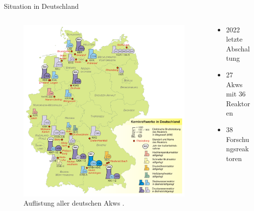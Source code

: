\begin{frame}{ Situation in Deutschland }
  \begin{columns}

    \begin{column}{0.48\textwidth}
      \begin{figure}
        \centering
        \includegraphics[width=1\textwidth]{./bilder/Kernkraftwerke_in_Deutschland.png}
        \caption{ Auflistung aller deutschen Akws \cite{ karte_abschaltungen }. }
        \label{ fig: karte_abschaltungen }
      \end{figure}
    \end{column}

    \begin{column}{0.48\textwidth}
      \begin{itemize}
        \setlength\itemsep{1.2em}
          \item{ 2022 letzte Abschaltung }
          \item{ 27 Akws mit 36 Reaktoren }
          \item{ 38 Forschungsreaktoren}
        \end{itemize}
    \end{column}
  \end{columns}
\end{frame}



